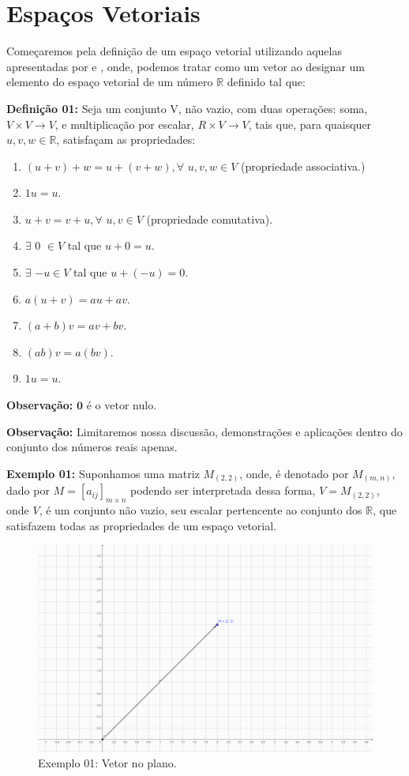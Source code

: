 \chapter{Espaços Vetoriais}
Começaremos pela definição de um espaço vetorial utilizando aquelas apresentadas por \cite{boldrini1980} e \cite{ulhoa2018}, onde, podemos tratar como um vetor ao designar um elemento do espaço vetorial de um número $\mathbb{R}$ definido tal que:

\noindent\textbf{Definição 01:} Seja um conjunto V, não vazio, com duas operações: soma, $V \times V \rightarrow V$, e multiplicação por escalar, $R \times V \rightarrow V$, tais que, para quaisquer $u, v, w \in \mathbb{R}$, satisfaçam as propriedades: \nocite{boldrini1980}

\begin{enumerate}
	\item $(u + v) + w = u + (v + w), \forall$ $u, v, w \in V$ (propriedade associativa.) 
	\item $1u = u$.
	\item $u + v = v + u, \forall$ $u, v \in V$ (propriedade comutativa).
	\item $\exists$ $0$ $\in V$ tal que $u + 0 = u$.
	\item $\exists$ $-u \in V$ tal que $u + (-u) = 0$.
	\item $a(u + v) = au + av$.
	\item $(a + b)v = av + bv$.
	\item $(ab)v = a(bv)$.
	\item $1u = u$.
\end{enumerate}

\noindent\textbf{Observação:} $\textbf{0}$ é o vetor nulo. \nocite{ulhoa2018}

\noindent\textbf{Observação:} Limitaremos nossa discussão, demonstrações e aplicações dentro do conjunto dos números reais apenas.

\noindent\textbf{Exemplo 01:} Suponhamos uma matriz $M_{(2, 2)}$, onde, é denotado por $M_{(m,n)}$, dado por $M = [a_{ij}]_{m \times n}$ podendo ser interpretada dessa forma, $V = M_{(2, 2)}$, onde $V$, é um conjunto não vazio, seu escalar pertencente ao conjunto dos $\mathbb{R}$, que satisfazem todas as propriedades de um espaço vetorial.

\begin{figure}[H]
	\centering
	\includegraphics[scale=1.0]{exemplo01.png}
	\caption{Exemplo 01: Vetor no plano.}
\end{figure}

